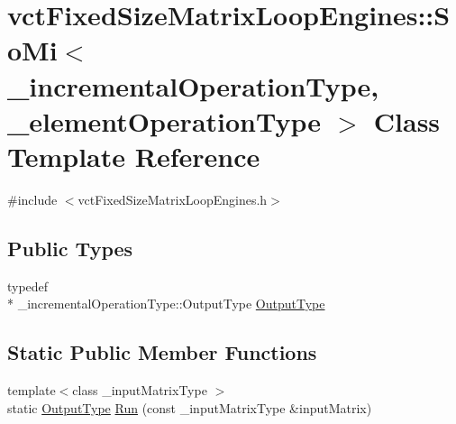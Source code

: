 \hypertarget{classvct_fixed_size_matrix_loop_engines_1_1_so_mi}{\section{vct\-Fixed\-Size\-Matrix\-Loop\-Engines\-:\-:So\-Mi$<$ \-\_\-incremental\-Operation\-Type, \-\_\-element\-Operation\-Type $>$ Class Template Reference}
\label{classvct_fixed_size_matrix_loop_engines_1_1_so_mi}
}


{\ttfamily \#include $<$vct\-Fixed\-Size\-Matrix\-Loop\-Engines.\-h$>$}

\subsection*{Public Types}
\begin{DoxyCompactItemize}
\item 
typedef \\*
\-\_\-incremental\-Operation\-Type\-::\-Output\-Type \hyperlink{classvct_fixed_size_matrix_loop_engines_1_1_so_mi_a8b6dbfea0d78d203a24342c80c62d6f9}{Output\-Type}
\end{DoxyCompactItemize}
\subsection*{Static Public Member Functions}
\begin{DoxyCompactItemize}
\item 
{\footnotesize template$<$class \-\_\-input\-Matrix\-Type $>$ }\\static \hyperlink{classvct_fixed_size_matrix_loop_engines_1_1_so_mi_a8b6dbfea0d78d203a24342c80c62d6f9}{Output\-Type} \hyperlink{classvct_fixed_size_matrix_loop_engines_1_1_so_mi_aaf984e73075c76f63efba0b37ec2c6f9}{Run} (const \-\_\-input\-Matrix\-Type \&input\-Matrix)
\end{DoxyCompactItemize}


